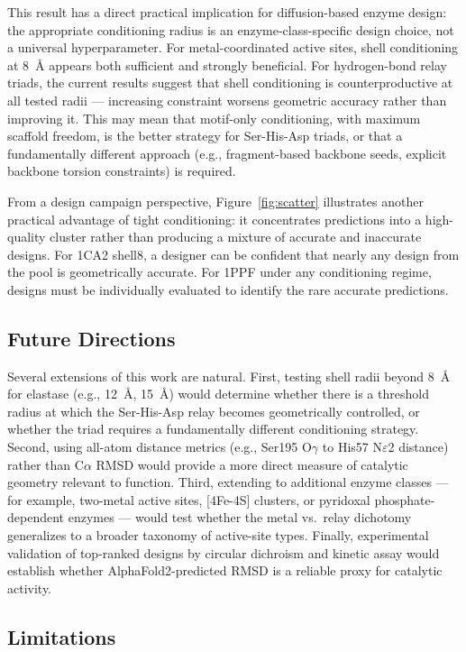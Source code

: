\documentclass[11pt,letterpaper]{article}
\begin{document}
This result has a direct practical implication for diffusion-based enzyme design: the appropriate conditioning radius is an enzyme-class-specific design choice, not a universal hyperparameter. For metal-coordinated active sites, shell conditioning at 8~\AA{} appears both sufficient and strongly beneficial. For hydrogen-bond relay triads, the current results suggest that shell conditioning is counterproductive at all tested radii — increasing constraint worsens geometric accuracy rather than improving it. This may mean that motif-only conditioning, with maximum scaffold freedom, is the better strategy for Ser-His-Asp triads, or that a fundamentally different approach (e.g., fragment-based backbone seeds, explicit backbone torsion constraints) is required.

From a design campaign perspective, Figure~\ref{fig:scatter} illustrates another practical advantage of tight conditioning: it concentrates predictions into a high-quality cluster rather than producing a mixture of accurate and inaccurate designs. For 1CA2 shell8, a designer can be confident that nearly any design from the pool is geometrically accurate. For 1PPF under any conditioning regime, designs must be individually evaluated to identify the rare accurate predictions.

\subsection{Future Directions}

Several extensions of this work are natural. First, testing shell radii beyond 8~\AA{} for elastase (e.g., 12~\AA{}, 15~\AA{}) would determine whether there is a threshold radius at which the Ser-His-Asp relay becomes geometrically controlled, or whether the triad requires a fundamentally different conditioning strategy. Second, using all-atom distance metrics (e.g., Ser195 O$\gamma$ to His57 N$\varepsilon$2 distance) rather than C$\alpha$ RMSD would provide a more direct measure of catalytic geometry relevant to function. Third, extending to additional enzyme classes — for example, two-metal active sites, [4Fe-4S] clusters, or pyridoxal phosphate-dependent enzymes — would test whether the metal vs.\ relay dichotomy generalizes to a broader taxonomy of active-site types. Finally, experimental validation of top-ranked designs by circular dichroism and kinetic assay would establish whether AlphaFold2-predicted RMSD is a reliable proxy for catalytic activity.

\subsection{Limitations}
\label{sec:limitations}
\end{document}
